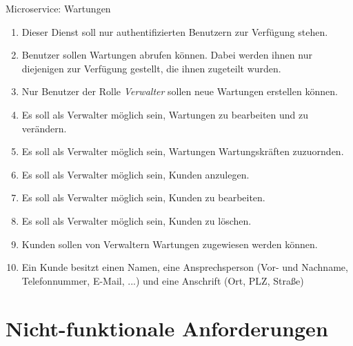 \documentclass[12pt]{scrreprt}
\newcommand{\itemh}[1]{{\bfseries\large\item #1}}
\begin{document}
\begin{enumerate}
    \itemh{Microservice: Wartungen}
    \begin{enumerate}
      \item Dieser Dienst soll nur authentifizierten Benutzern zur Verfügung stehen.
      \item Benutzer sollen Wartungen abrufen können. Dabei werden ihnen nur diejenigen zur Verfügung gestellt, die
        ihnen zugeteilt wurden.
      \item Nur Benutzer der Rolle \textit{Verwalter} sollen neue Wartungen erstellen können.
      \item Es soll als Verwalter möglich sein, Wartungen zu bearbeiten und zu verändern.
      \item Es soll als Verwalter möglich sein, Wartungen Wartungskräften zuzuornden.
      \item Es soll als Verwalter möglich sein, Kunden anzulegen.
      \item Es soll als Verwalter möglich sein, Kunden zu bearbeiten.
      \item Es soll als Verwalter möglich sein, Kunden zu löschen.
      \item Kunden sollen von Verwaltern Wartungen zugewiesen werden können.
      \item Ein Kunde besitzt einen Namen, eine Ansprechsperson (Vor- und Nachname, Telefonnummer, E-Mail, ...) und eine
        Anschrift (Ort, PLZ, Straße)
    \end{enumerate}

    
  \end{enumerate}

  \section{Nicht-funktionale Anforderungen}
\end{document}

